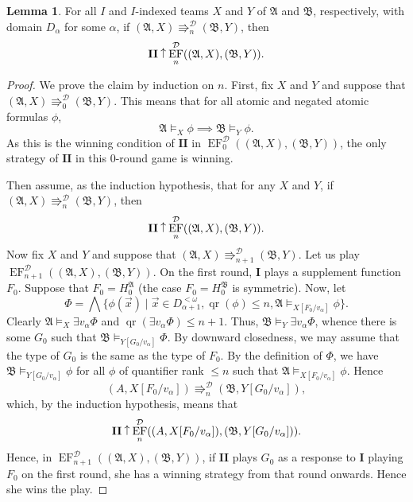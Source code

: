\documentclass[12pt]{article}
\theoremstyle{definition}
\newtheorem{lemma}[definition]{Lemma}
\newcommand{\wins}{\mathbin{\raisebox{0.8\depth}{$\uparrow$}}}
\newcommand{\playerone}{\mathrm{\mathbf{I}}}
\newcommand{\playertwo}{\mathrm{\mathbf{II}}}
\DeclareMathOperator{\EF}{EF}
\newcommand{\A}{\mathfrak{A}}
\newcommand{\B}{\mathfrak{B}}
\DeclareMathOperator{\qr}{qr}
\newcommand{\posEquiv}{\mathbin{\Rrightarrow}}
\newcommand{\deplog}{\mathcal D}
\begin{document}
\begin{lemma}\label{lemma: from logic to auxiliary game}
    For all $I$ and $I$-indexed teams $X$ and $Y$ of $\A$ and $\B$, respectively, with domain $D_\alpha$ for some $\alpha$, if $(\A,X)\posEquiv^\deplog_n(\B,Y)$, then
    \[
        \playertwo\wins\EF^\deplog_n((\A,X),(\B,Y)).
    \]
\end{lemma}
\begin{proof}
    We prove the claim by induction on $n$. First, fix $X$ and $Y$ and suppose that $(\A,X)\posEquiv^\deplog_0(\B,Y)$. This means that for all atomic and negated atomic formulas $\phi$,
    \[
        \A\models_X\phi \implies \B\models_Y\phi.
    \]
    As this is the winning condition of $\playertwo$ in $\EF^\deplog_0((\A,X),(\B,Y))$, the only strategy of $\playertwo$ in this $0$-round game is winning.

    Then assume, as the induction hypothesis, that for any $X$ and $Y$, if $(\A,X)\posEquiv^\deplog_n(\B,Y)$, then
    \[
        \playertwo\wins\EF^\deplog_n((\A,X),(\B,Y)).
    \]
    Now fix $X$ and $Y$ and suppose that $(\A,X)\posEquiv^\deplog_{n+1}(\B,Y)$. Let us play $\EF^\deplog_{n+1}((\A,X),(\B,Y))$. On the first round, $\playerone$ plays a supplement function $F_0$. Suppose that $F_0 = H^\A_0$ (the case $F_0 = H^\B_0$ is symmetric). Now, let
    \[
        \Phi = \bigwedge\{\phi(\vec x) \mid \vec x\in D_{\alpha+1}^{<\omega}, \qr(\phi)\leq n, \A\models_{X[F_0/v_\alpha]}\phi \}.
    \]
    Clearly $\A\models_X\exists v_\alpha\Phi$ and $\qr(\exists v_\alpha\Phi) \leq n+1$. Thus, $\B\models_Y\exists v_\alpha\Phi$, whence there is some $G_0$ such that $\B\models_{Y[G_0/v_\alpha]}\Phi$. By downward closedness, we may assume that the type of $G_0$ is the same as the type of $F_0$. By the definition of $\Phi$, we have $\B\models_{Y[G_0/v_\alpha]}\phi$ for all $\phi$ of quantifier rank $\leq n$ such that $\A\models_{X[F_0/v_\alpha]}\phi$. Hence
    \[
        (A,X[F_0/v_\alpha]) \posEquiv^\deplog_n (\B,Y[G_0/v_\alpha]),
    \]
    which, by the induction hypothesis, means that
    \[
        \playertwo\wins\EF^\deplog_n((A,X[F_0/v_\alpha]),(\B,Y[G_0/v_\alpha])).
    \]
    Hence, in $\EF^\deplog_{n+1}((\A,X),(\B,Y))$, if $\playertwo$ plays $G_0$ as a response to $\playerone$ playing $F_0$ on the first round, she has a winning strategy from that round onwards. Hence she wins the play.
\end{proof}
\end{document}
